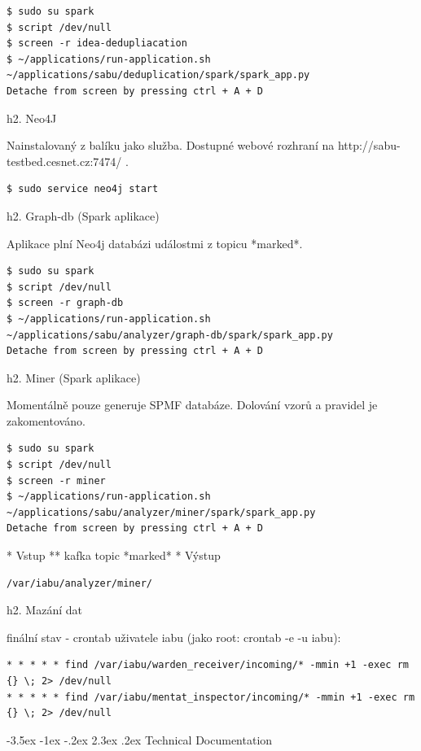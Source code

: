 \documentclass[a4paper]{article} %
\makeatletter
\renewcommand\section{\@startsection {section}{1}{\z@}%
                   {-3.5ex \@plus -1ex \@minus -.2ex}%
                   {2.3ex \@plus.2ex}%
                   {\normalfont\sffamily\Large\bfseries\color{projectcolor}}}
\makeatother
\begin{document}
\begin{lstlisting}[]
$ sudo su spark
$ script /dev/null
$ screen -r idea-dedupliacation
$ ~/applications/run-application.sh ~/applications/sabu/deduplication/spark/spark_app.py
Detache from screen by pressing ctrl + A + D
\end{lstlisting}

h2. Neo4J

Nainstalovaný z balíku jako služba. Dostupné webové rozhraní na http://sabu-testbed.cesnet.cz:7474/ .

\begin{lstlisting}[]
$ sudo service neo4j start
\end{lstlisting}

h2. Graph-db (Spark aplikace)

Aplikace plní Neo4j databázi událostmi z topicu *marked*.

\begin{lstlisting}[]
$ sudo su spark
$ script /dev/null
$ screen -r graph-db
$ ~/applications/run-application.sh ~/applications/sabu/analyzer/graph-db/spark/spark_app.py
Detache from screen by pressing ctrl + A + D
\end{lstlisting}

h2. Miner (Spark aplikace)

Momentálně pouze generuje SPMF databáze. Dolování vzorů a pravidel je zakomentováno.

\begin{lstlisting}[]
$ sudo su spark
$ script /dev/null
$ screen -r miner
$ ~/applications/run-application.sh ~/applications/sabu/analyzer/miner/spark/spark_app.py
Detache from screen by pressing ctrl + A + D
\end{lstlisting}

* Vstup
** kafka topic *marked*
* Výstup
\begin{lstlisting}[]
/var/iabu/analyzer/miner/
\end{lstlisting}

h2. Mazání dat

finální stav - crontab uživatele iabu (jako root: crontab -e -u iabu):
\begin{lstlisting}[]
* * * * * find /var/iabu/warden_receiver/incoming/* -mmin +1 -exec rm {} \; 2> /dev/null
* * * * * find /var/iabu/mentat_inspector/incoming/* -mmin +1 -exec rm {} \; 2> /dev/null
\end{lstlisting}

\cleardoublepage

\section{Technical Documentation}
\end{document}
